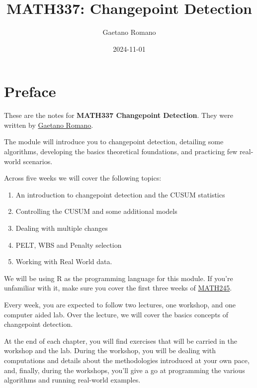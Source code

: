 \documentclass[
  letterpaper,
  DIV=11,
  numbers=noendperiod]{scrreprt}
\title{MATH337: Changepoint Detection}
\author{Gaetano Romano}
\date{2024-11-01}
\renewcommand*\contentsname{Table of contents}
\newcommand\contentsname{Table of contents}
\begin{document}
\maketitle

\renewcommand*\contentsname{Table of contents}
{
\hypersetup{linkcolor=}
\setcounter{tocdepth}{2}
\tableofcontents
}

\chapter*{Preface}\label{preface}


These are the notes for \textbf{MATH337 Changepoint Detection}. They
were written by \href{https://www.lancaster.ac.uk/~romano/}{Gaetano
Romano}.

The module will introduce you to changepoint detection, detailing some
algorithms, developing the basics theoretical foundations, and
practicing few real-world scenarios.

Across five weeks we will cover the following topics:

\begin{enumerate}
\def\labelenumi{\arabic{enumi}.}
\item
  An introduction to changepoint detection and the CUSUM statistics
\item
  Controlling the CUSUM and some additional models
\item
  Dealing with multiple changes
\item
  PELT, WBS and Penalty selection
\item
  Working with Real World data.
\end{enumerate}

We will be using R as the programming language for this module. If
you're unfamiliar with it, make sure you cover the first three weeks of
\href{https://lumath245.github.io/_book/index.html}{MATH245}.

Every week, you are expected to follow two lectures, one workshop, and
one computer aided lab. Over the lecture, we will cover the basics
concepts of changepoint detection.

At the end of each chapter, you will find exercises that will be carried
in the workshop and the lab. During the workshop, you will be dealing
with computations and details about the methodologies introduced at your
own pace, and, finally, during the workshops, you'll give a go at
programming the various algorithms and running real-world examples.
\end{document}
